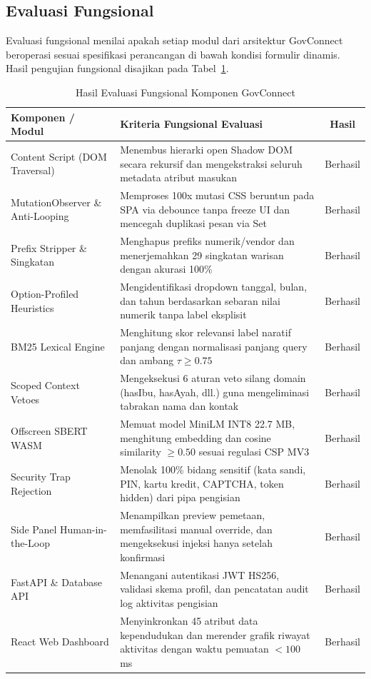 \documentclass[conference]{IEEEtran}
\begin{document}
\subsection{Evaluasi Fungsional}
Evaluasi fungsional menilai apakah setiap modul dari arsitektur GovConnect beroperasi sesuai spesifikasi perancangan di bawah kondisi formulir dinamis. Hasil pengujian fungsional disajikan pada Tabel~\ref{tab:functional_eval}.

\begin{table}[!htbp]
\caption{Hasil Evaluasi Fungsional Komponen GovConnect}
\label{tab:functional_eval}
\centering
\scriptsize
\setlength{\tabcolsep}{3pt}
\begin{tabularx}{\columnwidth}{p{2.2cm} X c}
\toprule
\textbf{Komponen / Modul} & \textbf{Kriteria Fungsional Evaluasi} & \textbf{Hasil} \\
\midrule
Content Script (DOM Traversal) & Menembus hierarki open Shadow DOM secara rekursif dan mengekstraksi seluruh metadata atribut masukan & Berhasil \\
MutationObserver \& Anti-Looping & Memproses 100x mutasi CSS beruntun pada SPA via debounce tanpa freeze UI dan mencegah duplikasi pesan via Set & Berhasil \\
Prefix Stripper \& Singkatan & Menghapus prefiks numerik/vendor dan menerjemahkan 29 singkatan warisan dengan akurasi 100\% & Berhasil \\
Option-Profiled Heuristics & Mengidentifikasi dropdown tanggal, bulan, dan tahun berdasarkan sebaran nilai numerik tanpa label eksplisit & Berhasil \\
BM25 Lexical Engine & Menghitung skor relevansi label naratif panjang dengan normalisasi panjang query dan ambang $\tau \ge 0.75$ & Berhasil \\
Scoped Context Vetoes & Mengeksekusi 6 aturan veto silang domain (hasIbu, hasAyah, dll.) guna mengeliminasi tabrakan nama dan kontak & Berhasil \\
Offscreen SBERT WASM & Memuat model MiniLM INT8 22.7 MB, menghitung embedding dan cosine similarity $\ge 0.50$ sesuai regulasi CSP MV3 & Berhasil \\
Security Trap Rejection & Menolak 100\% bidang sensitif (kata sandi, PIN, kartu kredit, CAPTCHA, token hidden) dari pipa pengisian & Berhasil \\
Side Panel Human-in-the-Loop & Menampilkan preview pemetaan, memfasilitasi manual override, dan mengeksekusi injeksi hanya setelah konfirmasi & Berhasil \\
FastAPI \& Database API & Menangani autentikasi JWT HS256, validasi skema profil, dan pencatatan audit log aktivitas pengisian & Berhasil \\
React Web Dashboard & Menyinkronkan 45 atribut data kependudukan dan merender grafik riwayat aktivitas dengan waktu pemuatan $<100$ ms & Berhasil \\
\bottomrule
\end{tabularx}
\end{table}
\end{document}
